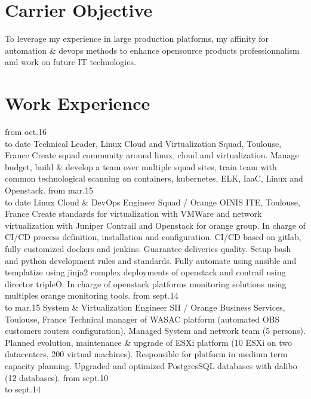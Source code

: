 \documentclass[]{friggeri-cv}
\begin{document}
\section{Carrier Objective}
    
    To leverage my experience in large production platforms, my affinity
    for automation \& devops methods to enhance opensource products professionnalism
    and work on future IT technologies. 

\section{Work Experience}
\begin{entrylist}
    \entry
        {from oct.16\\to date}
        {Technical Leader, Linux Cloud and Virtualization}
        {Squad, Toulouse, France}
	{Create squad community around linux, cloud and virtualization. Manage budget, build \& develop a 
        team over multiple squad sites, train team with common technological 
        scanning on containers, kubernetes, ELK, IaaC, Linux and Openstack.
        }
    \entry
        {from  mar.15\\to date}
        {Linux Cloud \& DevOps Engineer}
        {Squad / Orange OINIS ITE, Toulouse, France}
        {Create standards for virtualization with VMWare and network virtualization with Juniper 
        Contrail and Openstack for orange group. In charge of CI/CD process definition, 
        installation and configuration. CI/CD based on gitlab, fully customized dockers and jenkins.
        Guarantee deliveries quality. Setup bash and python development rules and standards.
        Fully automate using ansible and templatize using jinja2 complex deployments of openstack and
        contrail using director tripleO. In charge of openstack platforms monitoring solutions
        using multiples orange monitoring tools.
        }
    \entry
        {from sept.14\\to mar.15}
	{System \& Virtualization Engineer}
        {SII / Orange Business Services, Toulouse, France}
        {Technical manager of WASAC platform (automated OBS customers routers configuration).
        Managed System and network team (5 persons).
	Planned evolution, maintenance \& upgrade of ESXi platform (10 ESXi on two datacenters,
        200 virtual machines). 
        Responsible for platform in medium term capacity planning.
        Upgraded and optimized PostgresSQL databases with dalibo (12 databases).
        }
    \entry
        {from sept.10\\to sept.14}

\end{entrylist}
\end{document}

